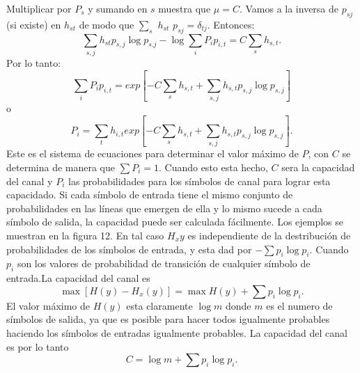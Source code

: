 Multiplicar por $P_s$ y sumando en $s$ muestra que $\mu = C$. Vamos a la inversa de $p_{sj}$ (si existe) en $h_{st}$  de modo que 
$\sum_{s}$ $h_{st}$ $p_{sj} = \delta_{tj}$. Entonces: 
\begin{equation}
  \sum_{s,j}h_{st} p_{s,j} \log{p_{s.j}} - \log{\sum_{i}P_i p_{i,t}} = C \sum_{s} h_{s,t}.
\end{equation}
Por lo tanto:
\begin{equation}
  \sum_{i} P_i p_{i,t} = exp[- C \sum_{s} h_{s,t}+ \sum_{s,j} h_{s,t} p_{s,j} \log{p_{s,j}}]
\end{equation}
o  
\begin{equation}
  P_i = \sum_{t} h_{i,t} exp[ - C \sum_{s} h_{s,t}+ \sum_{s,j} h_{s,t} p_{s,j} \log{p_{s,j}} ].
\end{equation}
Este es el sistema de ecuaciones para determinar el valor m\'aximo de
$P$, con $C$ se determina de manera que $\sum P_i = 1$. Cuando esto
esta hecho, $C$ sera la capacidad del canal y $P_i$ las probabilidades
para los s\'imbolos de canal para lograr esta capacidado.  Si cada
s\'imbolo de entrada tiene el mismo conjunto de probabilidades en las
l\'ineas que emergen de ella y lo mismo sucede a cada s\'imbolo de
salida, la capacidad puede ser calculada f\'acilmente. Los ejemplos se
muestran en la figura 12.  En tal caso $H_xy$ es independiente de la
destribuci\'on de probabilidades de los s\'imbolos de entrada, y esta
dad por $-\sum p_i \log{p_i}$.  Cuando $p_i$ son los valores de
probabilidad de transici\'on de cualquier s\'imbolo de entrada.La
capacidad del canal es
\begin{equation}
  \max [H(y) - H_x(y)] = \max H(y) + \sum p_i \log{p_i}.
\end{equation}
El valor m\'aximo de $H(y)$ esta claramente  $\log{m}$ donde $m$ es el numero de s\'imbolos de salida, ya que es posible para hacer 
todos igualmente probables haciendo los s\'imbolos de entradas igualmente probables. La capacidad del canal es por lo tanto
\begin{equation}
  C = \log{m} + \sum p_i \log{p_i}.
\end{equation}

